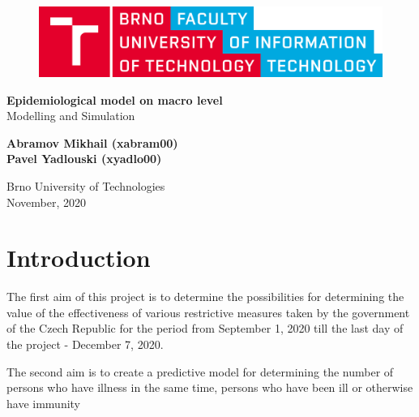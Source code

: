 \documentclass[12pt,a4paper,english]{article}
\newcommand{\todo}[1]{\noindent\textcolor{red}{[[\textbf{TODO} \textbf{#1]]}}\\}
\begin{document}
    \begin{titlepage}
        \begin{center}
            \vspace*{1cm}
        
            \begin{figure}[h!]
                \includegraphics[scale=0.12]{VUT-FIT-logo-en.png}
            \end{figure}
            \vspace{1.5cm}

            \Large{\textbf{Epidemiological model on macro level}} \\
            \large{Modelling and Simulation}

            \vspace{0.5cm}
                
            \vspace{1.5cm}
            
            \textbf{Abramov Mikhail (xabram00)} \\
            \textbf{Pavel Yadlouski (xyadlo00)} 

            \vfill
                
            \vspace{0.8cm}
        
            Brno University of Technologies\\
            November, 2020
                
        \end{center}
    \end{titlepage}

    \tableofcontents
    \newpage

    \section{Introduction}
    The first aim of this project is to determine the possibilities for determining the value of the effectiveness of various restrictive measures taken by the government of the Czech Republic for the period from September 1, 2020 till the last day of the project - December 7, 2020.

    The second aim is to create a predictive model for determining the number of persons who have illness in the same time, persons who have been ill or otherwise have immunity
    
\end{document}
